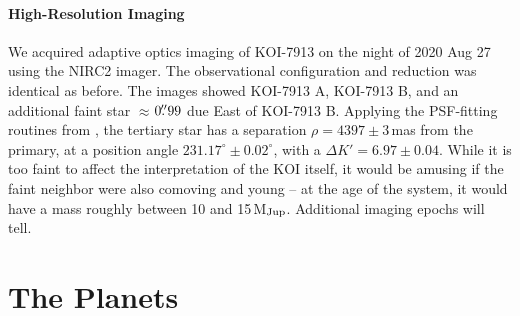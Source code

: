 \documentclass[12pt,twocolumn,linenumbers]{aastex63}
\begin{document}
\paragraph{High-Resolution Imaging}

We acquired adaptive optics imaging of KOI-7913 on the night of 2020
Aug 27 using the NIRC2 imager.  The
observational configuration and reduction was identical as before.
The images showed KOI-7913 A, KOI-7913 B, and an additional faint star
$\approx$$0\mbox{$.\!\!^{\prime\prime}$}99$ due East of KOI-7913 B.  Applying the PSF-fitting
routines from \citet{kraus_impact_2016}, the tertiary star has a
separation $\rho = 4397 \pm 3$\,mas from the primary, at a position
angle $231.17^\circ \pm 0.02^\circ$, with a $\Delta K' = 6.97 \pm
0.04$.  While it is too faint to affect the interpretation of the KOI
itself, it would be amusing if the faint neighbor were also comoving
and young -- at the age of the system, it would have a mass roughly
between 10 and 15\,M$_{\rm Jup}$.  Additional imaging epochs will 
tell.




\section{The Planets}
\label{sec:planets}
\end{document}
